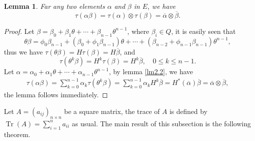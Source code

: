 \documentclass [11pt]{article}
\newtheorem{lem}[thm]{\bf Lemma}
\begin{document}
\begin{lem} \label{lm2.5}
Far any two elements $\alpha$ and $ \beta$  in $E$, we have
\begin{equation}\label{2.16}
\tau( \alpha\beta)=\tau( \alpha)\otimes \tau( \beta)=\overline{\alpha}\otimes \overline{\beta}.
\end{equation}
\end{lem}
\begin{proof}
 Let $\beta=\beta_{0}+\beta_{1} \theta+\cdots+\beta_{n-1} \theta^{n-1}$, where $\beta_{i}\in Q$, it is easily seen that
$$
\theta \beta=\phi_{0} \beta_{n-1}+\left(\beta_{0}+\phi_{1} \beta_{n-1}\right) \theta+\cdots+\left(\beta_{n-2}+\phi_{n-1} \beta_{n-1}\right) \theta^{n-1},
$$
thus we have $\tau(\theta \beta)=H \tau(\beta)=H \overline{\beta}$, and
\begin{equation}\label{2.17}
\tau\left(\theta^{k}\beta\right)=H^{k} \tau ( \beta)=H^{k} \overline{\beta}, \quad 0 \leq k \leq n-1.
\end{equation}
Let $\alpha=\alpha_{0} + \alpha_{1} \theta+\cdots+\alpha_{n-1} \theta^{n-1}$, by lemma \ref{lm2.2}, we have
\begin{align*}
\tau(\alpha \beta)=\sum_{k=0}^{n-1} \alpha_{k}  \tau\left(\theta^{k} \beta\right)=\sum_{k=0}^{n-1} \alpha_{k} H^{k} \overline{\beta}=H^{*} ( \overline{\alpha})  \overline{\beta}=\overline{\alpha}\otimes \overline{\beta},
\end{align*}
the lemma follows immediately.
\end{proof}

Let $A=\left(a_{i j}\right)_{n \times n}$ be a square matrix, the trace of $A$ is defined by  $\operatorname{Tr}(A)=\sum_{i=1}^{n} a_{ ii}$ as usual. The main result of this subsection is the following theorem.
\end{document}
